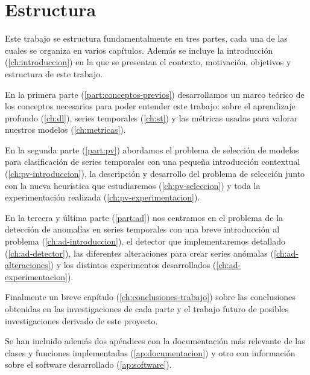 \section{Estructura}

Este trabajo se estructura fundamentalmente en tres partes, cada una de las cuales se organiza en varios capítulos. Además se incluye la introducción (\autoref{ch:introduccion}) en la que se presentan el contexto, motivación, objetivos y estructura de este trabajo.

En la primera parte (\autoref{part:conceptos-previos}) desarrollamos un marco teórico de los conceptos necesarios para poder entender este trabajo: sobre el aprendizaje profundo (\autoref{ch:dl}), series temporales (\autoref{ch:st}) y las métricas usadas para valorar nuestros modelos (\autoref{ch:metricas}).

En la segunda parte (\autoref{part:pv}) abordamos el problema de selección de modelos para clasificación de series temporales con una pequeña introducción contextual (\autoref{ch:pv-introduccion}), la descripción y desarrollo del problema de selección junto con la nueva heurística que estudiaremos (\autoref{ch:pv-seleccion}) y toda la experimentación realizada (\autoref{ch:pv-experimentacion}).

En la tercera y última parte (\autoref{part:ad}) nos centramos en el problema de la detección de anomalías en series temporales con una breve introducción al problema (\autoref{ch:ad-introduccion}), el detector que implementaremos detallado (\autoref{ch:ad-detector}), las diferentes alteraciones para crear series anómalas (\autoref{ch:ad-alteraciones}) y los distintos experimentos desarrollados (\autoref{ch:ad-experimentacion}).

Finalmente un breve capítulo (\autoref{ch:conclusiones-trabajo}) sobre las conclusiones obtenidas en las investigaciones de cada parte y el trabajo futuro de posibles investigaciones derivado de este proyecto.

Se han incluido además dos apéndices con la documentación más relevante de las clases y funciones implementadas (\autoref{ap:documentacion}) y otro con información sobre el software desarrollado (\autoref{ap:software}).

\endinput
